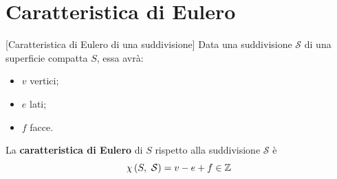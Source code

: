 \section{Caratteristica di Eulero}
\begin{definition}{}[Caratteristica di Eulero di una suddivisione]
	Data una suddivisione $\mathcal{S}$ di una superficie compatta $S$, essa avrà:
	\begin{itemize}
		\item $v$ vertici;
		\item $e$ lati;
		\item $f$ facce.
	\end{itemize}
La \textbf{caratteristica di Eulero} di $S$ rispetto alla suddivisione $\mathcal{S}$ è
\begin{equation*}
	\euler{S}{\mathcal{S}}=v-e+f\in\Z
\end{equation*}
\end{definition}
